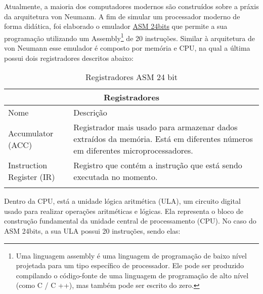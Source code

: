 Atualmente, a maioria dos computadores modernos são construídos sobre a práxis da arquitetura von Neumann. A fim de simular um processador moderno de forma didática, foi elaborado o emulador \href{https://gzsig.io/vm-24bits/}{ASM 24bits} que permite a sua programação utilizando um Assembly\footnote{Uma linguagem assembly é uma linguagem de programação de baixo nível projetada para um tipo específico de processador. Ele pode ser produzido compilando o código-fonte de uma linguagem de programação de alto nível (como C / C ++), mas também pode ser escrito do zero.} de 20 instruções. Similar à arquitetura de von Neumann esse emulador é composto por memória e CPU, na qual a última possui dois registradores descritos abaixo:

\vspace{1cm}
\begin{longtable}{ |p{3cm}||p{11cm}|  }
  \hline
  \multicolumn{2}{|c|}{Registradores} \\
  \hline
    Nome &
    Descrição\\
  \hline
    Accumulator (ACC) &
    Registrador mais usado para armazenar dados extraídos da memória. Está em diferentes números em diferentes microprocessadores. \\
  \hline
    Instruction Register (IR) &
    Registro que contém a instrução que está sendo executada no momento. \\
  \hline
  \caption{Registradores ASM 24 bit}
  \label{registers_asm}
\end{longtable}
\vspace{1cm}

Dentro da CPU, está a unidade lógica aritmética (ULA), um circuito digital usado para realizar operações aritméticas e lógicas. Ela representa o bloco de construção fundamental da unidade central de processamento (CPU). No caso do ASM 24bits, a sua ULA possui 20 instruções, sendo elas:

